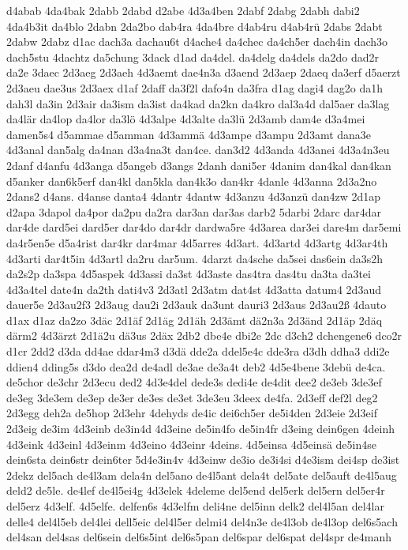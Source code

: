 {d4abab
4da4bak
2dabb
2dabd
d2abe
4d3a4ben
2dabf
2dabg
2dabh
dabi2
4da4b3it
da4blo
2dabn
2da2bo
dab4ra
4da4bre
d4ab4ru
d4ab4rü
2dabs
2dabt
2dabw
2dabz
d1ac
dach3a
dachau6t
d4ache4
da4chec
da4ch5er
dach4in
dach3o
dach5stu
4dachtz
da5chung
3dack
d1ad
da4del.
da4delg
da4dels
da2do
dad2r
da2e
3daec
2d3aeg
2d3aeh
4d3aemt
dae4n3a
d3aend
2d3aep
2daeq
da3erf
d5aerzt
2d3aeu
dae3us
2d3aex
d1af
2daff
da3f2l
dafo4n
da3fra
d1ag
dagi4
dag2o
da1h
dah3l
da3in
2d3air
da3ism
da3ist
da4kad
da2kn
da4kro
dal3a4d
dal5aer
da3lag
da4lär
da4lop
da4lor
da3lö
4d3alpe
4d3alte
da3lü
2d3amb
dam4e
d3a4mei
damen5s4
d5ammae
d5amman
4d3ammä
4d3ampe
d3ampu
2d3amt
dana3e
4d3anal
dan5alg
da4nan
d3a4na3t
dan4ce.
dan3d2
4d3anda
4d3anei
4d3a4n3eu
2danf
d4anfu
4d3anga
d5angeb
d3angs
2danh
dani5er
4danim
dan4kal
dan4kan
d5anker
dan6k5erf
dan4kl
dan5kla
dan4k3o
dan4kr
4danle
4d3anna
2d3a2no
2dans2
d4ans.
d4anse
danta4
4dantr
4dantw
4d3anzu
4d3anzü
dan4zw
2d1ap
d2apa
3dapol
da4por
da2pu
da2ra
dar3an
dar3as
darb2
5darbi
2darc
dar4dar
dar4de
dard5ei
dard5er
dar4do
dar4dr
dardwa5re
4d3area
dar3ei
dare4m
dar5emi
da4r5en5e
d5a4rist
dar4kr
dar4mar
4d5arres
4d3art.
4d3artd
4d3artg
4d3ar4th
4d3arti
dar4t5in
4d3artl
da2ru
dar5um.
4darzt
da4sche
da5sei
das6ein
da3s2h
da2s2p
da3spa
4d5aspek
4d3assi
da3st
4d3aste
das4tra
das4tu
da3ta
da3tei
4d3a4tel
date4n
da2th
dati4v3
2d3atl
2d3atm
dat4st
4d3atta
datum4
2d3aud
dauer5e
2d3au2f3
2d3aug
dau2i
2d3auk
da3unt
dauri3
2d3aus
2d3au2ß
4dauto
d1ax
d1az
da2zo
3däc
2d1äf
2d1äg
2d1äh
2d3ämt
dä2n3a
2d3änd
2d1äp
2däq
därm2
4d3ärzt
2d1ä2u
dä3us
2däx
2db2
dbe4e
dbi2e
2dc
d3ch2
dchengene6
dco2r
d1cr
2dd2
d3da
dd4ae
ddar4m3
d3dä
dde2a
ddel5e4c
dde3ra
d3dh
ddha3
ddi2e
ddien4
dding5s
d3do
dea2d
de4adl
de3ae
de3a4t
deb2
4d5e4bene
3debü
de4ca.
de5chor
de3chr
2d3ecu
ded2
4d3e4del
dede3s
dedi4e
de4dit
dee2
de3eb
3de3ef
de3eg
3de3em
de3ep
de3er
de3es
de3et
3de3eu
3deex
de4fa.
2d3eff
def2l
deg2
2d3egg
deh2a
de5hop
2d3ehr
4dehyds
de4ic
dei6ch5er
de5i4den
2d3eie
2d3eif
2d3eig
de3im
4d3einb
de3in4d
4d3eine
de5in4fo
de5in4fr
d3eing
dein6gen
4deinh
4d3eink
4d3einl
4d3einm
4d3eino
4d3einr
4deins.
4d5einsa
4d5einsä
de5in4se
dein6sta
dein6str
dein6ter
5d4e3in4v
4d3einw
de3io
de3i4si
d4e3ism
dei4sp
de3ist
2dekz
del5ach
de4l3am
dela4n
del5ano
de4l5ant
dela4t
del5ate
del5auft
de4l5aug
deld2
de5le.
de4lef
de4l5ei4g
4d3elek
4deleme
del5end
del5erk
del5ern
del5er4r
del5erz
4d3elf.
4d5elfe.
delfen6s
4d3elfm
deli4ne
del5inn
delk2
del4l5an
del4lar
delle4
del4l5eb
del4lei
dell5eic
del4l5er
delmi4
del4n3e
de4l3ob
de4l3op
del6s5ach
del4san
del4sas
del6sein
del6s5int
del6s5pan
del6spar
del6spat
del4spr
de4manh
}
